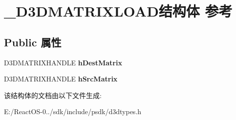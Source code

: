 \hypertarget{struct___d3_d_m_a_t_r_i_x_l_o_a_d}{}\section{\+\_\+\+D3\+D\+M\+A\+T\+R\+I\+X\+L\+O\+A\+D结构体 参考}
\label{struct___d3_d_m_a_t_r_i_x_l_o_a_d}
\subsection*{Public 属性}
\begin{DoxyCompactItemize}
\item 
\mbox{\label{struct___d3_d_m_a_t_r_i_x_l_o_a_d_af10a7ab3fb40621c64e4b0cac30bb8c5}} 
D3\+D\+M\+A\+T\+R\+I\+X\+H\+A\+N\+D\+LE {\bfseries h\+Dest\+Matrix}
\item 
\mbox{\label{struct___d3_d_m_a_t_r_i_x_l_o_a_d_aa3f629f70ae5c97a052f07f7ce6a3a1d}} 
D3\+D\+M\+A\+T\+R\+I\+X\+H\+A\+N\+D\+LE {\bfseries h\+Src\+Matrix}
\end{DoxyCompactItemize}


该结构体的文档由以下文件生成\+:\begin{DoxyCompactItemize}
\item 
E\+:/\+React\+O\+S-\/0../sdk/include/psdk/d3dtypes.\+h\end{DoxyCompactItemize}
